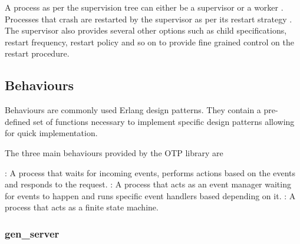 A process as per the supervision tree can either be a supervisor%
or a worker%
. Processes that crash are restarted by the supervisor as per its
restart strategy%
. The supervisor also provides several other options such as child
specifications, restart frequency, restart policy and so on to provide
fine grained control on the restart procedure.

\subsection{Behaviours}
\label{section:concepts.behaviours}
Behaviours are commonly used Erlang design patterns. They contain a pre-defined
set of functions necessary to implement specific design patterns allowing for
quick implementation.

The three main behaviours provided by the OTP library are

\begin{itemize}
    : A process that waits for incoming events, performs
    actions based on the events and responds to the request.
    : A process that acts as an event manager waiting for
    events to happen and runs specific event handlers based depending on it.
    : A process that acts as a finite state machine.
\end{itemize}

\subsubsection{gen\_server}
\label{section:gen.server}

